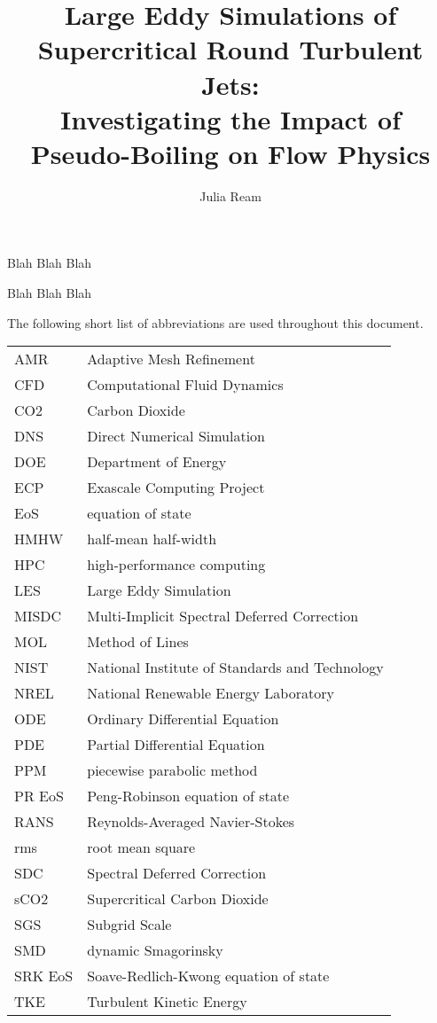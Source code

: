 \documentclass[11pt,expanded,copyright]{fsuthesis}
\title{Large Eddy Simulations of Supercritical Round Turbulent Jets:\protect\\ Investigating the Impact of Pseudo-Boiling on Flow Physics}
\author{Julia Ream}
\begin{document}
\frontmatter
\maketitle
\makecommitteepage

\begin{dedication}
Blah Blah Blah
\end{dedication}

\begin{acknowledgments}
Blah Blah Blah
\end{acknowledgments}

\tableofcontents
\listoftables
\listoffigures



\begin{listofabbrevs}
The following short list of abbreviations are used throughout this document. 
\begin{center}
\begin{tabular}{ll}
AMR& Adaptive Mesh Refinement \\
CFD& Computational Fluid Dynamics \\
CO2& Carbon Dioxide \\
DNS& Direct Numerical Simulation \\
DOE& Department of Energy \\
ECP& Exascale Computing Project \\
EoS& equation of state \\
HMHW& half-mean half-width \\
HPC& high-performance computing \\
LES& Large Eddy Simulation \\
MISDC& Multi-Implicit Spectral Deferred Correction \\
MOL& Method of Lines \\
NIST& National Institute of Standards and Technology \\
NREL& National Renewable Energy Laboratory \\
ODE& Ordinary Differential Equation \\
PDE& Partial Differential Equation \\
PPM& piecewise parabolic method \\
PR EoS& Peng-Robinson equation of state \\
RANS& Reynolds-Averaged Navier-Stokes \\
rms& root mean square \\
SDC& Spectral Deferred Correction \\
sCO2& Supercritical Carbon Dioxide \\
SGS& Subgrid Scale \\
SMD& dynamic Smagorinsky \\
SRK EoS& Soave-Redlich-Kwong equation of state \\
TKE& Turbulent Kinetic Energy \\






\end{tabular}
\end{center}
\end{listofabbrevs}
\end{document}
